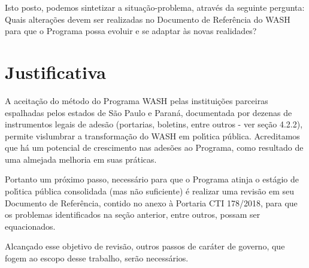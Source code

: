 \documentclass[
12pt,		%
openright,	%
twoside,  %
a4paper,			%
chapter=TITLE,		%
english,			%
french,				%
spanish,			%
brazil				%
]{USPSC-classe/USPSC}
\begin{document}
Isto posto, podemos sintetizar a situa\c{c}\~ao-problema, atrav\'es da seguinte pergunta: \textquotedbl Quais altera\c{c}\~oes devem ser realizadas no Documento de Refer\^encia do WASH para que o Programa possa evoluir e se adaptar \`as novas realidades?\textquotedbl 

















\section[Justificativa]{Justificativa}\label{Justificativa}
A aceita\c{c}\~ao do m\'etodo do Programa WASH pelas institui\c{c}\~oes parceiras espalhadas pelos estados de S\~ao Paulo e Paran\'a, documentada por dezenas de instrumentos legais de ades\~ao (portarias, boletins, entre outros - ver se\c{c}\~ao 4.2.2), permite vislumbrar a transforma\c{c}\~ao do WASH em pol\'{\i}tica p\'ublica. Acreditamos que h\'a um potencial de crescimento nas ades\~oes ao Programa, como resultado de uma almejada melhoria em suas pr\'aticas.

















Portanto um pr\'oximo passo, necess\'ario para que o Programa atinja o est\'agio de pol\'{\i}tica p\'ublica consolidada (mas n\~ao suficiente) \'e realizar uma revis\~ao em seu Documento de Refer\^encia, contido no anexo \`a Portaria CTI 178/2018, para que os problemas identificados na se\c{c}\~ao anterior, entre outros, possam ser equacionados.

















Alcan\c{c}ado esse objetivo de revis\~ao, outros passos de car\'ater de governo, que fogem ao escopo desse trabalho, ser\~ao necess\'arios.
\end{document}
